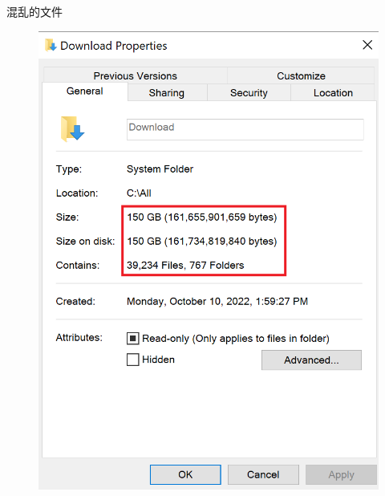 \documentclass{beamer}
\begin{document}
\begin{frame}{混乱的文件}
    \begin{minipage}[r]{0.3\linewidth}
        \medskip
        \begin{figure}[h]
            \centering
            \includegraphics[height=.6\textheight]{pic/down.png}
        \end{figure}
    \end{minipage}\hspace{1cm}
    \begin{minipage}[c]{0.5\linewidth}
        \medskip
        \begin{figure}[h]
            \centering

\end{figure}
\end{minipage}
\end{frame}
\end{document}
